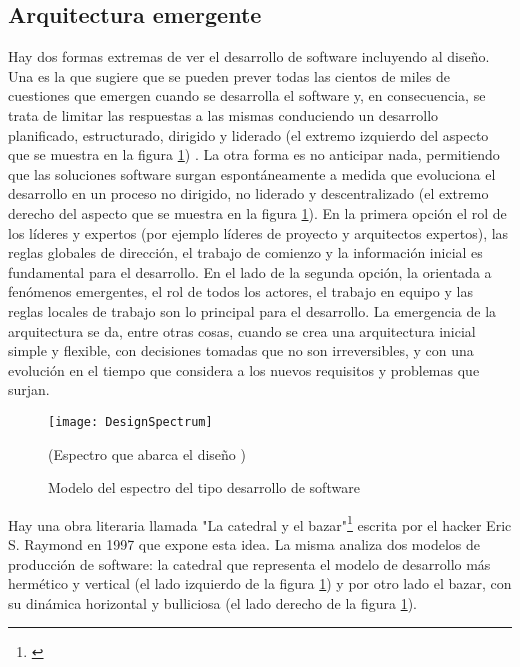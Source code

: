 \subsection{Arquitectura emergente}

Hay dos formas extremas de ver el desarrollo de software incluyendo al diseño. Una es la que sugiere que se pueden prever todas las cientos de miles de cuestiones que emergen cuando se desarrolla el software y, en consecuencia, se trata de limitar las respuestas a las mismas conduciendo un desarrollo planificado, estructurado, dirigido y liderado (el extremo izquierdo del aspecto que se muestra en la figura \ref{fig:DesignSpectrum}) \cite{Neal-Ford-2010}. La otra forma es no anticipar nada, permitiendo que las soluciones software surgan espontáneamente a medida que evoluciona el desarrollo en un proceso no dirigido, no liderado y descentralizado (el extremo derecho del aspecto que se muestra en la figura \ref{fig:DesignSpectrum}). En la primera opción el rol de los líderes y expertos (por ejemplo líderes de proyecto y arquitectos expertos), las reglas globales de dirección, el trabajo de comienzo y la información inicial es fundamental para el desarrollo. En el lado de la segunda opción, la orientada a fenómenos emergentes, el rol de todos los actores, el trabajo en equipo y las reglas locales de trabajo son lo principal para el desarrollo. La emergencia de la arquitectura se da, entre otras cosas, cuando se crea una arquitectura inicial simple y flexible, con decisiones tomadas que no son irreversibles, y con una evolución en el tiempo que considera a los nuevos requisitos y problemas que surjan.

\begin{figure}[h] 
  \centering
  \texttt{[image: DesignSpectrum]}
  \caption{Modelo del espectro del tipo desarrollo de software}
  (Espectro que abarca el diseño \cite{Neal-Ford-2010})
  \centering
  \label{fig:DesignSpectrum} %
\end{figure}

Hay una obra literaria llamada "La catedral y el bazar"\footnote{\cite{Eric-Raymond-1997}} escrita por el hacker Eric S. Raymond en 1997 que expone esta idea. La misma analiza dos modelos de producción de software: la catedral que representa el modelo de desarrollo más hermético y vertical (el lado izquierdo de la figura \ref{fig:DesignSpectrum}) y por otro lado el bazar, con su dinámica horizontal y bulliciosa (el lado derecho de la figura \ref{fig:DesignSpectrum}).


